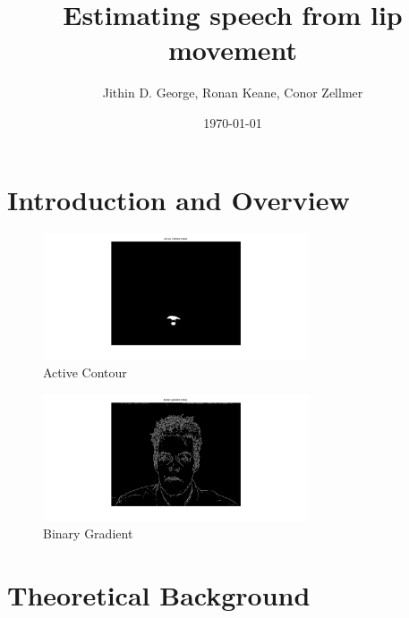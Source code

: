 \documentclass[a4paper]{article}
\title{Estimating speech from lip movement}
\author{Jithin D. George, Ronan Keane, Conor Zellmer}
\date{\today}
\begin{document}
\maketitle

\begin{abstract}

\end{abstract}

\section{Introduction and Overview}
\label{sec:introduction}

\begin{figure}[H] 
	\centering
	\includegraphics[width=0.7\textwidth]{active}
	\caption{Active Contour}	
\end{figure}

\begin{figure}[H] 
	\centering
	\includegraphics[width=0.7\textwidth]{binary}
	\caption{Binary Gradient}	
\end{figure}
\section{Theoretical Background}
\label{sec:theory}
\end{document}
